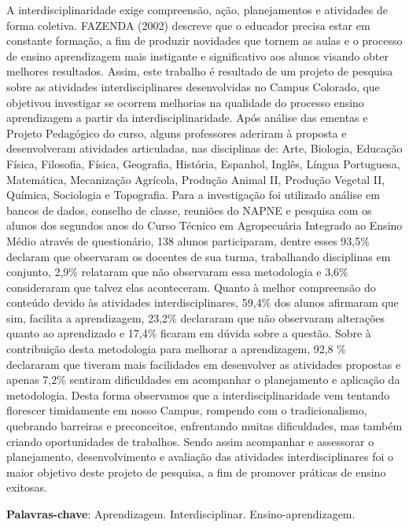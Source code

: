 \documentclass[article,12pt,onesidea,4paper,english,brazil]{abntex2}
\begin{document}
	\noindent A interdisciplinaridade exige compreensão, ação, planejamentos e atividades de
	forma coletiva. FAZENDA (2002) descreve que o educador precisa estar em
	constante formação, a fim de produzir novidades que tornem as aulas e o processo
	de ensino aprendizagem mais instigante e significativo aos alunos visando obter
	melhores resultados. Assim, este trabalho é resultado de um projeto de pesquisa
	sobre as atividades interdisciplinares desenvolvidas no Campus Colorado, que
	objetivou investigar se ocorrem melhorias na qualidade do processo ensino
	aprendizagem a partir da interdisciplinaridade. Após análise das ementas e Projeto
	Pedagógico do curso, alguns professores aderiram à proposta e desenvolveram
	atividades articuladas, nas disciplinas de: Arte, Biologia, Educação Física, Filosofia,
	Física, Geografia, História, Espanhol, Inglês, Língua Portuguesa, Matemática,
	Mecanização Agrícola, Produção Animal II, Produção Vegetal II, Química, Sociologia
	e Topografia. Para a investigação foi utilizado análise em bancos de dados,
	conselho de classe, reuniões do NAPNE e pesquisa com os alunos dos segundos
	anos do Curso Técnico em Agropecuária Integrado ao Ensino Médio através de
	questionário, 138 alunos participaram, dentre esses 93,5\% declaram que
	observaram os docentes de sua turma, trabalhando disciplinas em conjunto, 2,9\%
	relataram que não observaram essa metodologia e 3,6\% consideraram que talvez
	elas aconteceram. Quanto à melhor compreensão do conteúdo devido às atividades
	interdisciplinares, 59,4\% dos alunos afirmaram que sim, facilita a aprendizagem,
	23,2\% declararam que não observaram alterações quanto ao aprendizado e 17,4\%
	ficaram em dúvida sobre a questão. Sobre à contribuição desta metodologia para
	melhorar a aprendizagem, 92,8 \% declararam que tiveram mais facilidades em
	desenvolver as atividades propostas e apenas 7,2\% sentiram dificuldades em
	acompanhar o planejamento e aplicação da metodologia. Desta forma observamos
	que a interdisciplinaridade vem tentando florescer timidamente em nosso Campus,
	rompendo com o tradicionalismo, quebrando barreiras e preconceitos, enfrentando
	muitas dificuldades, mas também criando oportunidades de trabalhos. Sendo assim
	acompanhar e assessorar o planejamento, desenvolvimento e avaliação das
	atividades interdisciplinares foi o maior objetivo deste projeto de pesquisa, a fim de
	promover práticas de ensino exitosas.
	
	\vspace{\onelineskip}
	
	\noindent
	\textbf{Palavras-chave}: Aprendizagem. Interdisciplinar. Ensino-aprendizagem.
	
\end{document}
